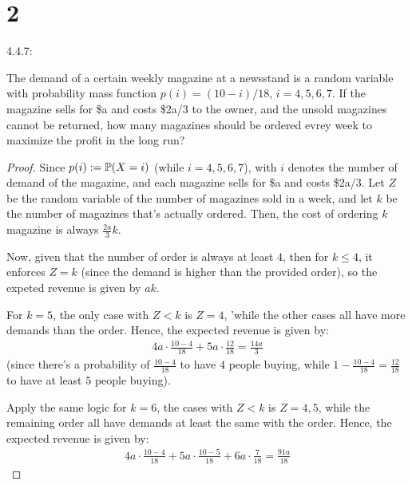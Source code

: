 \documentclass{article}
\begin{document}
\newpage

\section*{2}
\begin{ques}\label{q2}
    4.4.7:

    The demand of a certain weekly magazine at a newsstand is a random variable with probability mass function $p(i)=(10-i)/18$, $i=4,5,6,7$. If the magazine sells for \$a and costs \$2a/3 to the owner, and the unsold magazines cannot be returned, how many magazines should be ordered evrey week to maximize the profit in the long run?
\end{ques}
\begin{proof}
    Since $p(i):=\mathbb{P}(X= i)$ (while $i=4,5,6,7$), with $i$ denotes the number of demand of the magazine, and each magazine sells for \$a and costs \$2a/3. Let $Z$ be the random variable of the number of magazines sold in a week, and let $k$ be the number of magazines that's actually ordered. Then, the cost of ordering $k$ magazine is always $\frac{2a}{3}k$.

    Now, given that the number of order is always at least $4$, then for $k\leq 4$, it enforces $Z=k$ (since the demand is higher than the provided order), so the expeted revenue is given by $ak$.

    For $k=5$, the only  case with $Z<k$ is $Z=4$, 'while the other cases all have more demands than the order. Hence, the expected revenue is given by:
    \begin{align}
        4a\cdot \frac{10-4}{18} + 5a \cdot \frac{12}{18} = \frac{14a}{3}
    \end{align}
    (since there's a probability of $\frac{10-4}{18}$ to have $4$ people buying, while $1-\frac{10-4}{18}=\frac{12}{18}$ to have at least $5$ people buying).

    Apply the same logic for $k=6$, the cases with $Z<k$ is $Z=4,5$, while the remaining order all have demands at least the same with the order. Hence, the expected revenue is given by:
    \begin{align}
        4a\cdot \frac{10-4}{18} + 5a\cdot \frac{10-5}{18} + 6a \cdot \frac{7}{18} = \frac{91a}{18}
    \end{align}


\end{proof}
\end{document}
